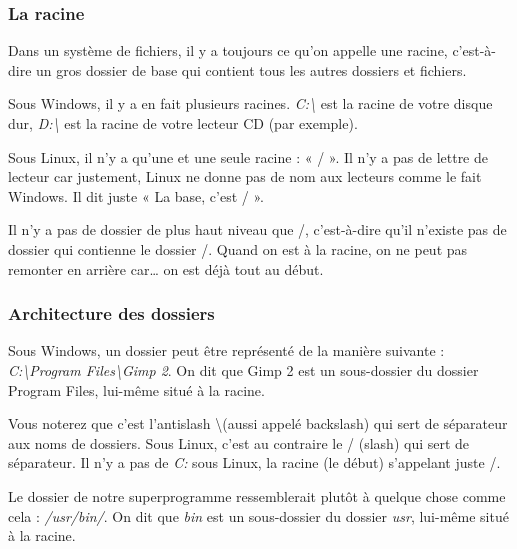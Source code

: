 \documentclass[11pt,oneside]{article}
\begin{document}
\subsubsection{La racine}

Dans un système de fichiers, il y a toujours ce qu'on appelle une racine, c'est-à-dire un gros dossier de base qui contient tous les autres dossiers et fichiers.

Sous Windows, il y a en fait plusieurs racines. \textit{C:\textbackslash} est la racine de votre disque dur, \textit{D:\textbackslash} est la racine de votre lecteur CD (par exemple).

Sous Linux, il n'y a qu'une et une seule racine : « / ». Il n'y a pas de lettre de lecteur car justement, Linux ne donne pas de nom aux lecteurs comme le fait Windows. Il dit juste « La base, c'est / ».

Il n'y a pas de dossier de plus haut niveau que /, c'est-à-dire qu'il n'existe pas de dossier qui contienne le dossier /. Quand on est à la racine, on ne peut pas remonter en arrière car… on est déjà tout au début.

\subsubsection{Architecture des dossiers}

Sous Windows, un dossier peut être représenté de la manière suivante : \textit{C:\textbackslash Program Files\textbackslash Gimp 2}. On dit que Gimp 2 est un sous-dossier du dossier Program Files, lui-même situé à la racine.

Vous noterez que c'est l'antislash \textbackslash (aussi appelé backslash) qui sert de séparateur aux noms de dossiers. Sous Linux, c'est au contraire le / (slash) qui sert de séparateur.
Il n'y a pas de \textit{C:} sous Linux, la racine (le début) s'appelant juste /.

Le dossier de notre superprogramme ressemblerait plutôt à quelque chose comme cela : \textit{/usr/bin/}. On dit que \textit{bin} est un sous-dossier du dossier \textit{usr}, lui-même situé à la racine.
\end{document}
